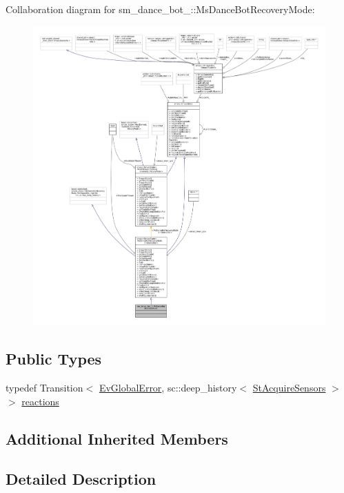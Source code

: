 Collaboration diagram for sm\+\_\+dance\+\_\+bot\+\_\+:\+:Ms\+Dance\+Bot\+Recovery\+Mode\+:
\nopagebreak
\begin{figure}[H]
\begin{center}
\leavevmode
\includegraphics[width=350pt]{classsm__dance__bot__3_1_1MsDanceBotRecoveryMode__coll__graph}
\end{center}
\end{figure}
\subsection*{Public Types}
\begin{DoxyCompactItemize}
\item 
typedef Transition$<$ \hyperlink{structsm__dance__bot__3_1_1EvGlobalError}{Ev\+Global\+Error}, sc\+::deep\+\_\+history$<$ \hyperlink{structsm__dance__bot__3_1_1StAcquireSensors}{St\+Acquire\+Sensors} $>$ $>$ \hyperlink{classsm__dance__bot__3_1_1MsDanceBotRecoveryMode_ab3ad0a27ba2ecead1caaf7d0c802d495}{reactions}
\end{DoxyCompactItemize}
\subsection*{Additional Inherited Members}


\subsection{Detailed Description}



